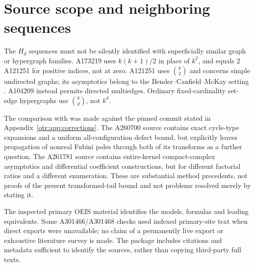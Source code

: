 \documentclass[11pt,a4paper]{article}
\theoremstyle{definition}\newtheorem{definition}[theorem]{Definition}
\theoremstyle{remark}\newtheorem{remark}[theorem]{Remark}
\begin{document}
\section{Source scope and neighboring sequences}\label{otr:app:scope}%
The $H_d$ sequences must not be silently identified with superficially similar graph or hypergraph families. A173219 uses $k(k+1)/2$ in place of $k^2$, and equals $2$A121251 for positive indices, not at zero. A121251 uses $\binom{k}{2}$ and concerns simple undirected graphs; its asymptotics belong to the Bender--Canfield--McKay setting \cite{bcm}. A104209 instead permits directed multiedges. Ordinary fixed-cardinality set-edge hypergraphs use $\binom{k}{d}$, not $k^d$.

The comparison with \cite{pdc,mc,transseries} was made against the pinned commit stated in Appendix~\ref{otr:app:corrections}. The A260700 source contains exact cycle-type expansions and a uniform all-configuration defect bound, but explicitly leaves propagation of nonreal Fubini poles through both of its transforms as a further question. The A261781 source contains entire-kernel compact-complex asymptotics and differential coefficient constructions, but for different factorial ratios and a different enumeration. These are substantial method precedents, not proofs of the present transformed-tail bound and not problems resolved merely by stating it.

The inspected primary OEIS material identifies the models, formulas and leading equivalents. Some A301466/A301468 checks used indexed primary-site text when direct exports were unavailable; no claim of a permanently live export or exhaustive literature survey is made. The package includes citations and metadata sufficient to identify the sources, rather than copying third-party full texts.
\end{document}
